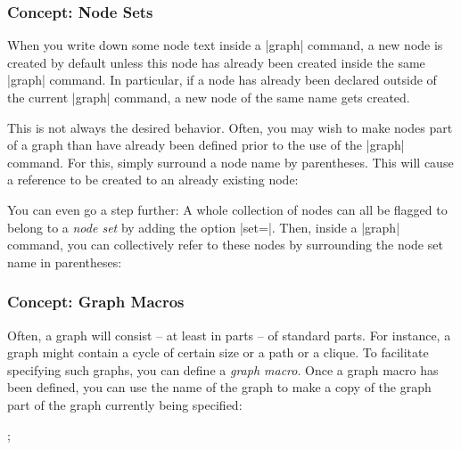 \subsubsection{Concept: Node Sets}

When you write down some node text inside a |graph| command, a new node is
created by default unless this node has already been created inside the same
|graph| command. In particular, if a node has already been declared outside of
the current |graph| command, a new node of the same name gets created.

This is not always the desired behavior. Often, you may wish to make nodes part
of a graph than have already been defined prior to the use of the |graph|
command. For this, simply surround a node name by parentheses. This will cause
a reference to be created to an already existing node:
%
\begin{codeexample}[preamble={\usetikzlibrary{graphs}}]
\end{codeexample}

You can even go a step further: A whole collection of nodes can all be flagged
to belong to a \emph{node set} by adding the option |set=|.
Then, inside a |graph| command, you can collectively refer to these nodes by
surrounding the node set name in parentheses:
%
\begin{codeexample}[preamble={\usetikzlibrary{graphs,shapes.geometric}}]
\end{codeexample}


\subsubsection{Concept: Graph Macros}

Often, a graph will consist -- at least in parts -- of standard parts. For
instance, a graph might contain a cycle of certain size or a path or a clique.
To facilitate specifying such graphs, you can define a \emph{graph macro}. Once
a graph macro has been defined, you can use the name of the graph to make a
copy of the graph part of the graph currently being specified:
%
\begin{codeexample}[preamble={\usetikzlibrary{graphs.standard}}]
\tikz {};
\end{codeexample}

